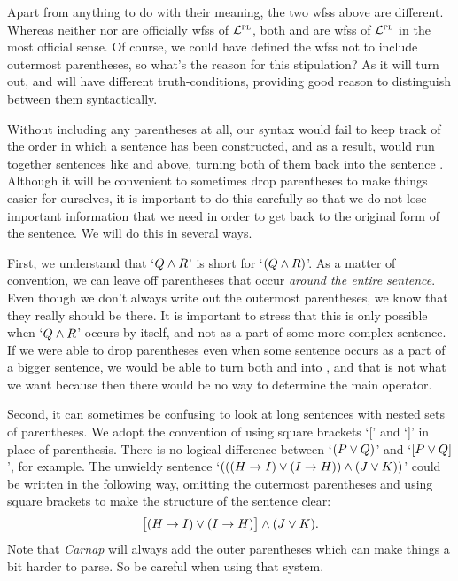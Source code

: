 \begin{earg} \label{scope}
\end{earg}

Apart from anything to do with their meaning, the two wfss above are different.
Whereas neither  nor  are officially wfss of $\mathcal{L}^{\textsc{pl}}$, both  and  are wfss of $\mathcal{L}^{\textsc{pl}}$ in the most official sense.
Of course, we could have defined the wfss not to include outermost parentheses, so what's the reason for this stipulation?
As it will turn out,  and  will have different truth-conditions, providing good reason to distinguish between them syntactically.

Without including any parentheses at all, our syntax would fail to keep track of the order in which a sentence has been constructed, and as a result, would run together sentences like  and  above, turning both of them back into the sentence .
Although it will be convenient to sometimes drop parentheses to make things easier for ourselves, it is important to do this carefully so that we do not lose important information that we need in order to get back to the original form of the sentence.
We will do this in several ways.

First, we understand that `$Q \wedge R$' is short for `$(Q \wedge R)$'.
As a matter of convention, we can leave off parentheses that occur \emph{around the entire sentence}.
Even though we don't always write out the outermost parentheses, we know that they really should be there.
It is important to stress that this is only possible when `$Q \wedge R$' occurs by itself, and not as a part of some more complex sentence. 
If we were able to drop parentheses even when some sentence occurs as a part of a bigger sentence, we would be able to turn both  and  into , and that is not what we want because then there would be no way to determine the main operator.

Second, it can sometimes be confusing to look at long sentences with nested sets of parentheses.
We adopt the convention of using square brackets `[' and `]' in place of parenthesis.
There is no logical difference between `$(P\vee Q)$' and `$[P\vee Q]$', for example.
The unwieldy sentence `$(((H \rightarrow I) \vee (I \rightarrow H)) \wedge (J \vee K))$' could be written in the following way, omitting the outermost parentheses and using square brackets to make the structure of the sentence clear:
  $$\bigl[(H \rightarrow I) \vee (I \rightarrow H)\bigr] \wedge (J \vee K).$$
Note that \textit{Carnap} will always add the outer parentheses which can make things a bit harder to parse.
So be careful when using that system.

